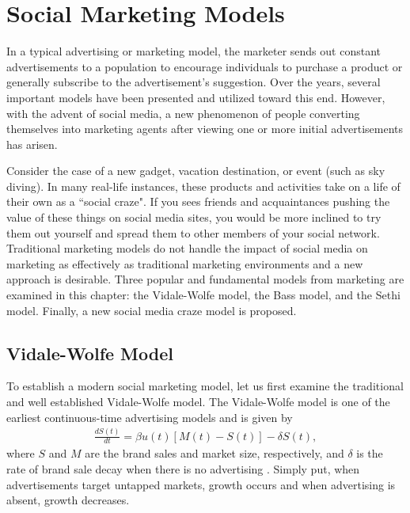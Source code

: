 \chapter{Social Marketing Models} \label{chapter_marketing}
In a typical advertising or marketing model, the marketer sends out constant advertisements to a population to encourage individuals to purchase a product or generally subscribe to the advertisement's suggestion. Over the years, several important models have been presented and utilized toward this end. However, with the advent of social media, a new phenomenon of people converting themselves into marketing agents after viewing one or more initial advertisements has arisen. 

Consider the case of a new gadget, vacation destination, or event (such as sky diving). In many real-life instances, these products and activities take on a life of their own as a ``social craze". If you sees friends and acquaintances pushing the value of these things on social media sites, you would be more inclined to try them out yourself and spread them to other members of your social network. Traditional marketing models do not handle the impact of social media on marketing as effectively as traditional marketing environments and a new approach is desirable. Three popular and fundamental models from marketing are examined in this chapter: the Vidale-Wolfe model, the Bass model, and the Sethi model. Finally, a new social media craze model is proposed.

\section{Vidale-Wolfe Model}
To establish a modern social marketing model, let us first examine the traditional and well established Vidale-Wolfe model. The Vidale-Wolfe model is one of the earliest continuous-time advertising models and is given by
\begin{equation} \label{eqn:VidaleWolfe1}
\left.\begin{aligned}
\frac{dS(t)}{dt}=\beta u(t)[M(t)-S(t)]-\delta S(t),
\end{aligned}\right.
\end{equation}
\noindent where $S$ and $M$ are the brand sales and market size, respectively, and $\delta$ is the rate of brand sale decay when there is no advertising \cite{naik2015marketing}. Simply put, when advertisements target untapped markets, growth occurs and when advertising is absent, growth decreases. 

